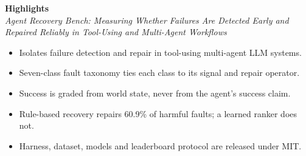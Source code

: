 \documentclass[11pt]{article}
\begin{document}
\begin{center}
{\large\bfseries Highlights}\\[2pt]
{\itshape Agent Recovery Bench: Measuring Whether Failures Are Detected Early and
Repaired Reliably in Tool-Using and Multi-Agent Workflows}
\end{center}
\vspace{1em}
\begin{itemize}\setlength{\itemsep}{6pt}
\item Isolates failure detection and repair in tool-using multi-agent LLM systems.
\item Seven-class fault taxonomy ties each class to its signal and repair operator.
\item Success is graded from world state, never from the agent's success claim.
\item Rule-based recovery repairs 60.9\% of harmful faults; a learned ranker does not.
\item Harness, dataset, models and leaderboard protocol are released under MIT.
\end{itemize}
\end{document}
